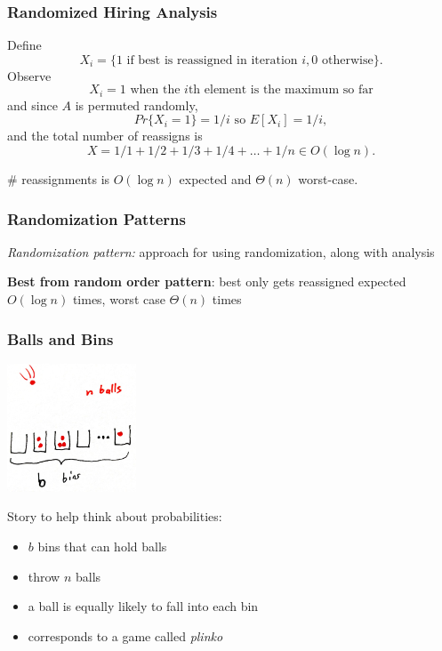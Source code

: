 \documentclass[10pt]{beamer}
\begin{document}
\begin{frame} \frametitle{Randomized Hiring Analysis}
Define
\[ X_i = \{\text{1 if best is reassigned in iteration } i, 0 \text{ otherwise} \} .\]
Observe
\[ X_i = 1 \text{ when the } i\text{th element is the maximum so far} \]
and since $A$ is permuted randomly,
\[ Pr\{X_i=1\} = 1/i \text{ so } E[X_i] = 1/i, \]
and the total number of reassigns is
\[ X = 1/1 + 1/2 + 1/3 + 1/4 + \ldots + 1/n \in O(\log n). \]

\# reassignments is $O(\log n)$ expected and $\Theta(n)$ worst-case.
\end{frame}


\begin{frame} \frametitle{Randomization Patterns}
\emph{Randomization pattern:} approach for using randomization, along with
analysis
\vspace{1cm}

\textbf{Best from random order pattern}: best only gets reassigned expected $O(\log n)$ times,
worst case $\Theta(n)$ times

\end{frame}

\begin{frame} \frametitle{Balls and Bins}
  \begin{center}
    \includegraphics[height=1.5in]{balls-bins.jpg}
  \end{center}

Story to help think about probabilities:
\begin{itemize}
  \item $b$ bins that can hold balls
  \item throw $n$ balls
  \item a ball is equally likely to fall into each bin
  \item corresponds to a game called \emph{plinko}
\end{itemize}
\end{frame}
\end{document}
